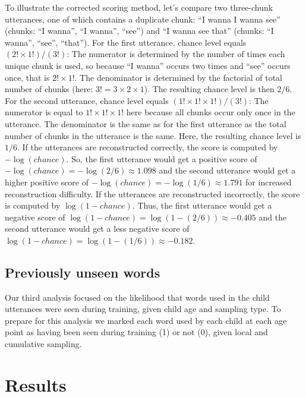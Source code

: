 \documentclass[
  english,
  man,mask,floatsintext]{apa6}
\begin{document}
To illustrate the corrected scoring method, let's compare two three-chunk utterances, one of which contains a duplicate chunk: \enquote{I wanna I wanna see} (chunks: \enquote{I wanna}, \enquote{I wanna}, \enquote{see}) and \enquote{I wanna see that} (chunks: \enquote{I wanna}, \enquote{see}, \enquote{that}). For the first utterance, chance level equals \((2!\times1!)/(3!)\): The numerator is determined by the number of times each unique chunk is used, so because \enquote{I wanna} occurs two times and \enquote{see} occurs once, that is \(2!\times1!\). The denominator is determined by the factorial of total number of chunks (here: \(3! = 3\times2\times1\)). The resulting chance level is then \(2/6\). For the second utterance, chance level equals \((1!\times1!\times1!)/(3!)\): The numerator is equal to \(1!\times1!\times1!\) here because all chunks occur only once in the utterance. The denominator is the same as for the first utterance as the total number of chunks in the utterance is the same. Here, the resulting chance level is \(1/6\). If the utterances are reconstructed correctly, the score is computed by \(-\log(chance)\). So, the first utterance would get a positive score of \(-\log(chance) = -\log(2/6) \approx 1.098\) and the second utterance would get a higher positive score of \(-\log(chance) = -\log(1/6) \approx 1.791\) for increased reconstruction difficulty. If the utterances are reconstructed incorrectly, the score is computed by \(\log(1-chance)\). Thus, the first utterance would get a negative score of \(\log(1-chance) = \log(1-(2/6)) \approx -0.405\) and the second utterance would get a less negative score of \(\log(1-chance) = \log(1-(1/6)) \approx -0.182\).

\hypertarget{previously-unseen-words}{%
\subsection{Previously unseen words}\label{previously-unseen-words}}

Our third analysis focused on the likelihood that words used in the child utterances were seen during training, given child age and sampling type. To prepare for this analysis we marked each word used by each child at each age point as having been seen during training (1) or not (0), given local and cumulative sampling.

\hypertarget{results}{%
\section{Results}\label{results}}
\end{document}
